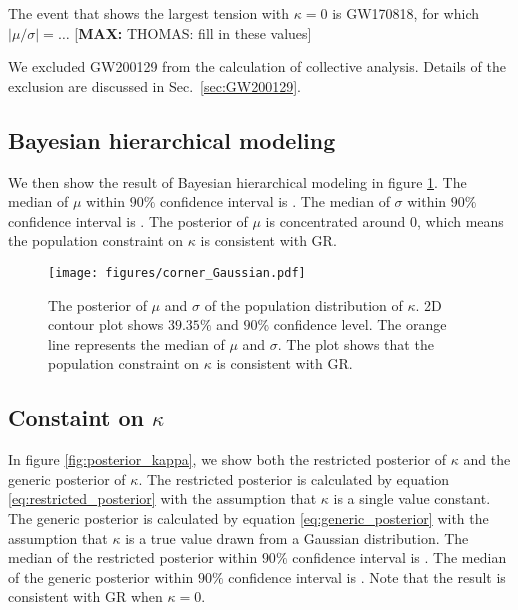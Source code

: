 \documentclass[aps,prd,twocolumn,superscriptaddress,preprintnumbers,floatfix,nofootinbib]{revtex4-2}
\newcommand*{\mi}[1]{\textsf{\color{magenta} [\textbf{MAX:} #1]}}
\begin{document}
The event that shows the largest tension with $\kappa = 0$ is GW170818, for which $|\mu / \sigma| = \dots$ \mi{THOMAS: fill in these values}

We excluded GW200129 from the calculation of collective analysis.
Details of the exclusion are discussed in Sec.~\ref{sec:GW200129}.

\subsection{Bayesian hierarchical modeling}
We then show the result of Bayesian hierarchical modeling in figure \ref{fig:corner_Gaussian}.
The median of $\mu$ within $90\%$ confidence interval is .
The median of $\sigma$ within $90\%$ confidence interval is .
The posterior of $\mu$ is concentrated around $0$, which means the population constraint on $\kappa$ is consistent with GR.

\begin{figure}
    \texttt{[image: figures/corner\_Gaussian.pdf]}
    \caption{
        The posterior of $\mu$ and $\sigma$ of the population distribution of $\kappa$.
        2D contour plot shows $39.35\%$ and $90\%$ confidence level.
        The orange line represents the median of $\mu$ and $\sigma$.
        The plot shows that the population constraint on $\kappa$ is consistent with GR.
    }
    \label{fig:corner_Gaussian}
\end{figure}

\subsection{Constaint on $\kappa$}
In figure \ref{fig:posterior_kappa}, we show both the restricted posterior of $\kappa$ and the generic posterior of $\kappa$.
The restricted posterior is calculated by equation \ref{eq:restricted_posterior} with the assumption that $\kappa$ is a single value constant.
The generic posterior is calculated by equation \ref{eq:generic_posterior} with the assumption that $\kappa$ is a true value drawn from a Gaussian distribution.
The median of the restricted posterior within $90\%$ confidence interval is .
The median of the generic posterior within $90\%$ confidence interval is .
Note that the result is consistent with GR when $\kappa=0$.
\end{document}
